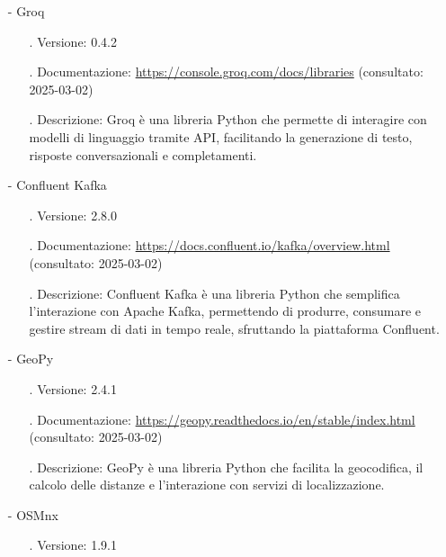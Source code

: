 \documentclass[10pt]{article}
\begin{document}
\begin{justify}
\begin{itemize}
\begin{itemize}
                        \end{itemize}
                    \item[-] Groq
                        \begin{itemize}
                            \item[.] Versione: 0.4.2
                            \item[.] Documentazione: \url{https://console.groq.com/docs/libraries} (consultato: 2025-03-02)
                            \item[.] Descrizione: Groq è una libreria Python che permette di interagire con modelli di linguaggio tramite API, facilitando la 
                            generazione di testo, risposte conversazionali e completamenti.
                        \end{itemize}
                    \item[-] Confluent Kafka
                        \begin{itemize}
                            \item[.] Versione: 2.8.0
                            \item[.] Documentazione: \url{https://docs.confluent.io/kafka/overview.html} (consultato: 2025-03-02)
                            \item[.] Descrizione: Confluent Kafka è una libreria Python che semplifica l’interazione con Apache Kafka, permettendo di produrre, 
                            consumare e gestire stream di dati in tempo reale, sfruttando la piattaforma Confluent.
                        \end{itemize}
                    \item[-] GeoPy
                    \begin{itemize}
                        \item[.] Versione: 2.4.1
                        \item[.] Documentazione: \url{https://geopy.readthedocs.io/en/stable/index.html} (consultato: 2025-03-02)
                        \item[.] Descrizione: GeoPy è una libreria Python che facilita la geocodifica, il calcolo delle distanze e l'interazione con servizi di localizzazione.
                    \end{itemize}
                    \item[-] OSMnx
                        \begin{itemize}
                            \item[.] Versione: 1.9.1

\end{itemize}
\end{itemize}
\end{justify}
\end{document}
